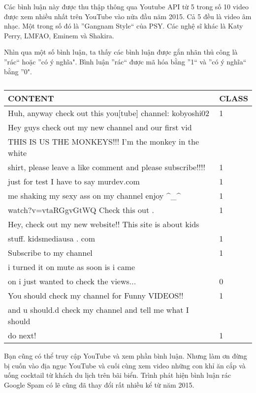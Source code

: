 Các bình luận này được thu thập thông qua Youtube API từ 5 trong số 10 video được xem nhiều nhất trên YouTube vào nửa đầu năm 2015. Cả 5 đều là video âm nhạc. Một trong số đó là ''Gangnam Style`` của PSY. Các nghệ sĩ khác là Katy Perry, LMFAO, Eminem và Shakira.

Nhìn qua một số bình luận, ta thấy các bình luận được gắn nhãn thủ công là ''rác`` hoặc ''có ý nghĩa". Bình luận ''rác`` được mã hóa bằng ''1`` và ''có ý nghĩa`` bằng ''0".

\begin{table}[]
\caption{}
\label{tab:my-table}
\begin{tabular}{|l|l|}
\hline
CONTENT  & CLASS \\ \hline
Huh, anyway check out this you{[}tube{]} channel: kobyoshi02 & 1 \\ \hline
Hey guys check out my new channel and our first vid \\ THIS IS US THE MONKEYS!!! I'm the monkey in the white \\   shirt, please leave a like comment and please subscribe!!!! & 1 \\ \hline
just for test I have to say murdev.com  & 1     \\ \hline
me shaking my sexy ass on my channel enjoy \textasciicircum{}\_\textasciicircum{}  & 1     \\ \hline
watch?v=vtaRGgvGtWQ Check this out . & 1 \\ \hline
Hey, check out my new website!! This site is about kids \\  stuff. kidsmediausa . com   & 1     \\ \hline
Subscribe to my channel & 1     \\ \hline
i turned it on mute as soon is i came \\ on i just wanted to check the views... & 0     \\ \hline
You should check my channel for Funny VIDEOS!!  & 1     \\ \hline
and u should.d check my channel and tell me what I should \\ do next!  & 1     \\ \hline
\end{tabular}
\end{table}

Bạn cũng có thể truy cập YouTube và xem phần bình luận. Nhưng làm ơn đừng bị cuốn vào địa ngục YouTube và cuối cùng xem video những con khỉ ăn cắp và uống cocktail từ khách du lịch trên bãi biển. Trình phát hiện bình luận rác Google Spam có lẽ cũng đã thay đổi rất nhiều kể từ năm 2015.

